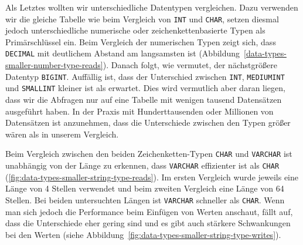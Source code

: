 Als Letztes wollten wir unterschiedliche Datentypen vergleichen.
Dazu verwenden wir die gleiche Tabelle wie beim Vergleich von \texttt{INT} und \texttt{CHAR}, setzen diesmal jedoch unterschiedliche numerische oder zeichenkettenbasierte Typen als Primärschlüssel ein.
Beim Vergleich der numerischen Typen zeigt sich, dass \texttt{DECIMAL} mit deutlichem Abstand am langsamsten ist (Abbildung~\ref{data-types-smaller-number-type-reads}).
Danach folgt, wie vermutet, der nächstgrößere Datentyp \texttt{BIGINT}.
Auffällig ist, dass der Unterschied zwischen \texttt{INT}, \texttt{MEDIUMINT} und \texttt{SMALLINT} kleiner ist als erwartet.
Dies wird vermutlich aber daran liegen, dass wir die Abfragen nur auf eine Tabelle mit wenigen tausend Datensätzen ausgeführt haben.
In der Praxis mit Hunderttausenden oder Millionen von Datensätzen ist anzunehmen, dass die Unterschiede zwischen den Typen größer wären als in unserem Vergleich.

Beim Vergleich zwischen den beiden Zeichenketten-Typen \texttt{CHAR} und \texttt{VARCHAR} ist unabhängig von der Länge zu erkennen, dass \texttt{VARCHAR} effizienter ist als \texttt{CHAR} (\ref{fig:data-types-smaller-string-type-reads}).
Im ersten Vergleich wurde jeweils eine Länge von 4 Stellen verwendet und beim zweiten Vergleich eine Länge von 64 Stellen.
Bei beiden untersuchten Längen ist \texttt{VARCHAR} schneller als \texttt{CHAR}.
Wenn man sich jedoch die Performance beim Einfügen von Werten anschaut, fällt auf, dass die Unterschiede eher gering sind und es gibt auch stärkere Schwankungen bei den Werten (siehe Abbildung~\ref{fig:data-types-smaller-string-type-writes}).

